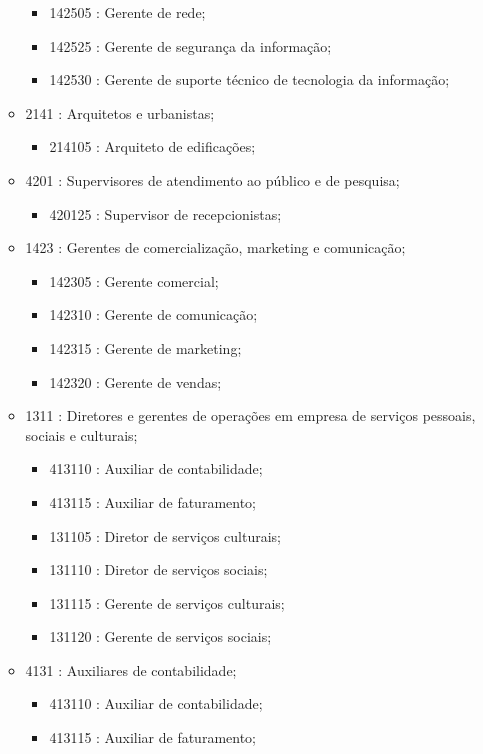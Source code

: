 \begin{itemize}
\begin{itemize}
\begin{itemize}
      \item 142505 : Gerente de rede;
      \item 142525 : Gerente de segurança da informação;
      \item 142530 : Gerente de suporte técnico de tecnologia da informação;
    \end{itemize}
    \item 2141 : Arquitetos e urbanistas;
    \begin{itemize}
      \item 214105 : Arquiteto de edificações;
    \end{itemize}
    \item 4201 : Supervisores de atendimento ao público e de pesquisa;
    \begin{itemize}
      \item 420125 : Supervisor de recepcionistas;
    \end{itemize}
    \item 1423 : Gerentes de comercialização, marketing e comunicação;
    \begin{itemize}
      \item 142305 : Gerente comercial;
      \item 142310 : Gerente de comunicação;
      \item 142315 : Gerente de marketing;
      \item 142320 : Gerente de vendas;
    \end{itemize}
    \item 1311 : Diretores e gerentes de operações em empresa de serviços pessoais, sociais e culturais;
    \begin{itemize}
      \item 413110 : Auxiliar de contabilidade;
      \item 413115 : Auxiliar de faturamento;
      \item 131105 : Diretor de serviços culturais;
      \item 131110 : Diretor de serviços sociais;
      \item 131115 : Gerente de serviços culturais;
      \item 131120 : Gerente de serviços sociais;
    \end{itemize}
    \item 4131 : Auxiliares de contabilidade;
    \begin{itemize}
      \item 413110 : Auxiliar de contabilidade;
      \item 413115 : Auxiliar de faturamento;

\end{itemize}
\end{itemize}
\end{itemize}
